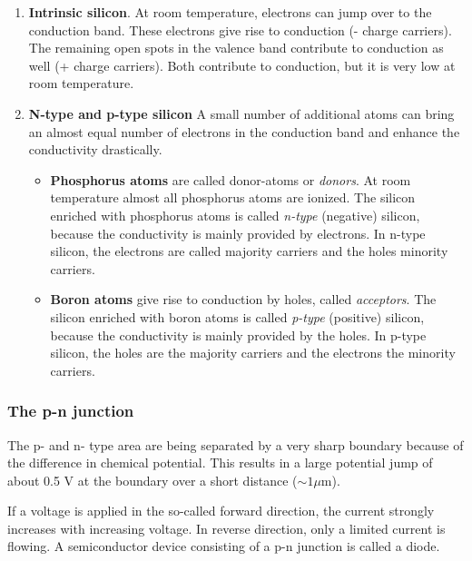 \documentclass[a4paper,10pt]{article}
\begin{document}
\begin{enumerate}
 \item \textbf{Intrinsic silicon}. At room temperature, electrons can jump over to the conduction band. These electrons give rise to conduction (- charge carriers). The remaining open spots in the valence band contribute to conduction as well (+ charge carriers). Both contribute to conduction, but it is very low at room temperature.
 \item \textbf{N-type and p-type silicon} A small number of additional atoms can bring an almost equal number of electrons in the conduction band and enhance the conductivity drastically.
 \begin{itemize}
  \item \textbf{Phosphorus atoms} are called donor-atoms or \emph{donors}. At room temperature almost all phosphorus atoms are ionized. The silicon enriched with phosphorus atoms is called \emph{n-type} (negative) silicon, because the conductivity is mainly provided by electrons. In n-type silicon, the electrons are called majority carriers and the holes minority carriers.
  \item \textbf{Boron atoms} give rise to conduction by holes, called \emph{acceptors}. The silicon enriched with boron atoms is called \emph{p-type} (positive) silicon, because the conductivity is mainly provided by the holes. In p-type silicon, the holes are the majority carriers and the electrons the minority carriers.
 \end{itemize}
\end{enumerate}

\subsubsection{The p-n junction}

The p- and n- type area are being separated by a very sharp boundary because of the difference in chemical potential. This results in a large potential jump of about 0.5 V at the boundary over a short distance ($\sim 1 \mu$m). \bigskip

If a voltage is applied in the so-called forward direction, the current strongly increases with increasing voltage. In reverse direction, only a limited current is flowing. A semiconductor device consisting of a p-n junction is called a diode.
\end{document}
